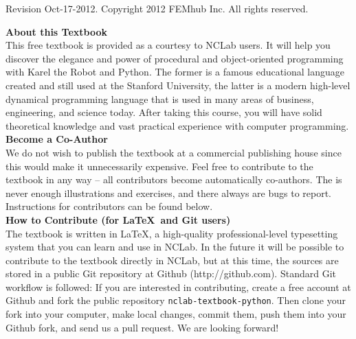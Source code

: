\documentclass[article,A4,12pt]{llncs}
\newif\iffullversion
\begin{document}
\begin{center}
\end{center}
\vbox{}
\vspace{5mm}
\begin{center}
\iffullversion
\else
\centerline{\huge \color{red}{PREVIEW}}
\fi
\vfill
\end{center}
\vfill
\vfill
\begin{center}
Revision Oct-17-2012. Copyright 2012 FEMhub Inc. All rights reserved.
\end{center}
\newpage
\vbox{}
\vfill
{
\noindent
{\bf About this Textbook}\\[4mm]
This free textbook is provided as a courtesy to NCLab users. 
It will help you discover the elegance and power of procedural and 
object-oriented programming with Karel the Robot and Python. The former 
is a famous educational language created and still used at the Stanford University, 
the latter is a modern high-level dynamical programming language that is used
in many areas of business, engineering, and science today. After taking 
this course, you will have solid theoretical knowledge and vast
practical experience with computer programming. \\[4mm]

\noindent
{\bf Become a Co-Author}\\[4mm]
We do not wish to publish the textbook at a commercial publishing house since this 
would make it unnecessarily expensive. Feel free to contribute to the textbook in any way 
-- all contributors become automatically co-authors. The is never enough illustrations 
and exercises, and there always are bugs to report. Instructions for contributors 
can be found below.\\[4mm]

\noindent
{\bf How to Contribute (for \LaTeX \ and Git users)}\\[4mm]
\noindent
The textbook is written in \LaTeX, a high-quality professional-level typesetting system that 
you can learn and use in NCLab. In the future it will be possible to contribute to 
the textbook directly in NCLab, but at this time, the sources are stored 
in a public Git repository at Github (http://github.com). Standard Git workflow is 
followed: If you are interested in contributing, create a free account at Github and 
fork the public repository {\tt nclab-textbook-python}. Then clone your fork into 
your computer, make local changes, commit them, push them into your Github fork, 
and send us a pull request. We are looking forward! \\[4mm]

}
\end{document}
